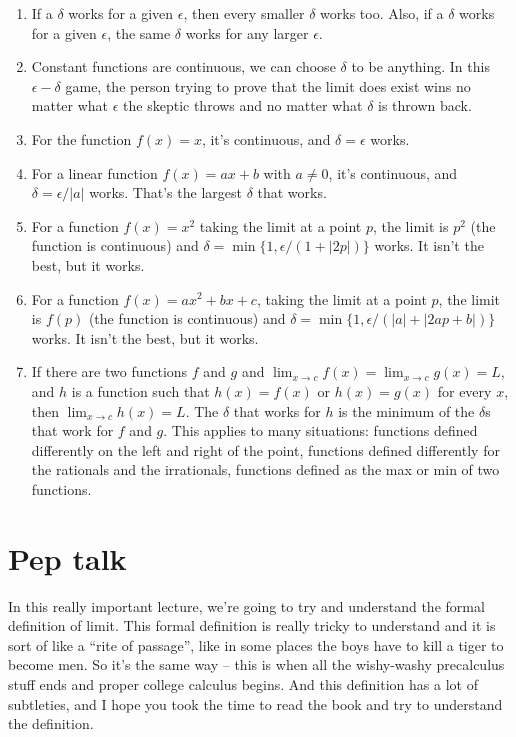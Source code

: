 \documentclass[10pt]{amsart}
\begin{document}
\begin{enumerate}
\item If a $\delta$ works for a given $\epsilon$, then every smaller
  $\delta$ works too. Also, if a $\delta$ works for a given
  $\epsilon$, the same $\delta$ works for any larger $\epsilon$.
\item Constant functions are continuous, we can choose $\delta$ to be
  anything. In this $\epsilon-\delta$ game, the person trying to prove
  that the limit does exist wins no matter what $\epsilon$ the skeptic
  throws and no matter what $\delta$ is thrown back.
\item For the function $f(x) = x$, it's continuous, and $\delta =
\epsilon$ works.
\item For a linear function $f(x) = ax + b$ with $a \ne 0$, it's
  continuous, and $\delta = \epsilon/|a|$ works. That's the largest
  $\delta$ that works.
\item For a function $f(x) = x^2$ taking the limit at a point $p$, the
  limit is $p^2$ (the function is continuous) and $\delta = \min\{1,
  \epsilon/(1 + |2p|) \}$ works. It isn't the best, but it works.
\item For a function $f(x) = ax^2 + bx + c$, taking the limit at a
  point $p$, the limit is $f(p)$ (the function is continuous) and
  $\delta = \min \{1, \epsilon/(|a| + |2ap + b|) \}$ works. It isn't
  the best, but it works.
\item If there are two functions $f$ and $g$ and $\lim_{x \to c} f(x)
  = \lim_{x \to c} g(x) = L$, and $h$ is a function such that $h(x) =
  f(x)$ or $h(x) = g(x)$ for every $x$, then $\lim_{x \to c} h(x) =
  L$. The $\delta$ that works for $h$ is the minimum of the $\delta$s
  that work for $f$ and $g$. This applies to many situations:
  functions defined differently on the left and right of the point,
  functions defined differently for the rationals and the irrationals,
  functions defined as the max or min of two functions.
\end{enumerate}

\section*{Pep talk}

In this really important lecture, we're going to try and understand
the formal definition of limit. This formal definition is really
tricky to understand and it is sort of like a ``rite of passage'',
like in some places the boys have to kill a tiger to become men. So
it's the same way -- this is when all the wishy-washy precalculus
stuff ends and proper college calculus begins. And this definition has
a lot of subtleties, and I hope you took the time to read the book and
try to understand the definition.
\end{document}
